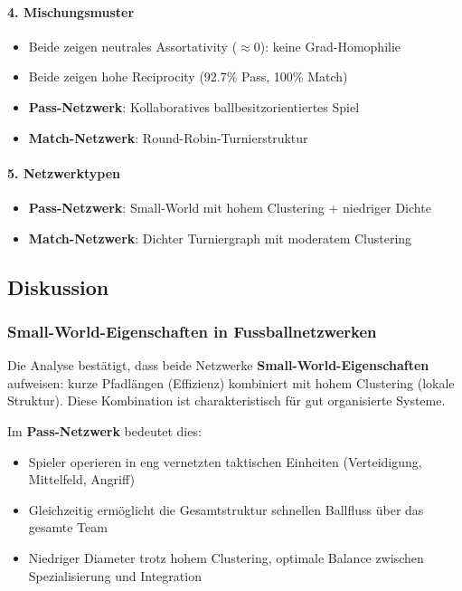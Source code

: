 \paragraph{4. Mischungsmuster}
\begin{itemize}
  \item Beide zeigen neutrales Assortativity ($\approx 0$): keine Grad-Homophilie
  \item Beide zeigen hohe Reciprocity (92.7\% Pass, 100\% Match)
  \item \textbf{Pass-Netzwerk}: Kollaboratives ballbesitzorientiertes Spiel
  \item \textbf{Match-Netzwerk}: Round-Robin-Turnierstruktur
\end{itemize}

\paragraph{5. Netzwerktypen}
\begin{itemize}
  \item \textbf{Pass-Netzwerk}: Small-World mit hohem Clustering + niedriger Dichte
  \item \textbf{Match-Netzwerk}: Dichter Turniergraph mit moderatem Clustering
\end{itemize}

\subsection{Diskussion}

\subsubsection{Small-World-Eigenschaften in Fussballnetzwerken}

Die Analyse bestätigt, dass beide Netzwerke \textbf{Small-World-Eigenschaften} aufweisen: kurze Pfadlängen (Effizienz) kombiniert mit hohem Clustering (lokale Struktur). Diese Kombination ist charakteristisch für gut organisierte Systeme.

Im \textbf{Pass-Netzwerk} bedeutet dies:
\begin{itemize}
  \item Spieler operieren in eng vernetzten taktischen Einheiten (Verteidigung, Mittelfeld, Angriff)
  \item Gleichzeitig ermöglicht die Gesamtstruktur schnellen Ballfluss über das gesamte Team
  \item Niedriger Diameter trotz hohem Clustering, optimale Balance zwischen Spezialisierung und Integration
\end{itemize}

